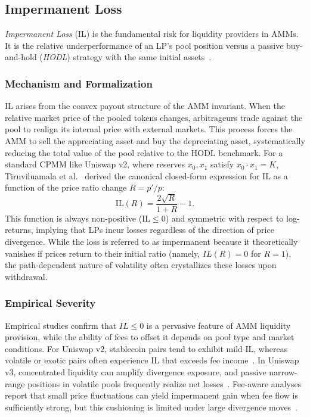 \documentclass[10pt,conference,compsocconf]{IEEEtran}
\begin{document}
\subsection{Impermanent Loss}
\label{sec:background_il}

\emph{Impermanent Loss} (IL) is the fundamental risk for liquidity providers in AMMs. It is the relative underperformance of an LP's pool position versus a passive buy-and-hold (\emph{HODL}) strategy with the same initial assets~\cite{evans2021liquidity, aoyagi2020liquidity}.


\subsubsection{Mechanism and Formalization}
IL arises from the convex payout structure of the AMM invariant. When the relative market price of the pooled tokens changes, arbitrageurs trade against the pool to realign its internal price with external markets. This process forces the AMM to sell the appreciating asset and buy the depreciating asset, systematically reducing the total value of the pool relative to the HODL benchmark.
For a standard CPMM like Uniswap v2, where reserves $x_0, x_1$ satisfy $x_0 \cdot x_1 = K$, Tiruviluamala et al.~\cite{tiruviluamala2022general} derived the canonical closed-form expression for IL as a function of the price ratio change $R = p'/p$:
\begin{equation}
    \mathrm{IL}(R) = \frac{2\sqrt{R}}{1+R} - 1.
    \label{eq:il_canonical}
\end{equation}
This function is always non-positive ($\mathrm{IL} \le 0$) and symmetric with respect to log-returns, implying that LPs incur losses regardless of the direction of price divergence. While the loss is referred to as impermanent because it theoretically vanishes if prices return to their initial ratio (namely, $IL(R)=0$ for $R=1$), the path-dependent nature of volatility often crystallizes these losses upon withdrawal.

\subsubsection{Empirical Severity}
Empirical studies confirm that $IL \le 0$ is a pervasive feature of AMM liquidity provision, while the ability of fees to offset it depends on pool type and market conditions. 
For Uniswap v2, stablecoin pairs tend to exhibit mild IL, whereas volatile or exotic pairs often experience IL that exceeds fee income~\cite{heimbach2021behavior, boueri2021g3m}. 
In Uniswap v3, concentrated liquidity can amplify divergence exposure, and passive narrow-range positions in volatile pools frequently realize net losses~\cite{heimbach2022risks}. 
Fee-aware analyses report that small price fluctuations can yield impermanent gain when fee flow is sufficiently strong, but this cushioning is limited under large divergence moves~\cite{roman2025impact}.
\end{document}
